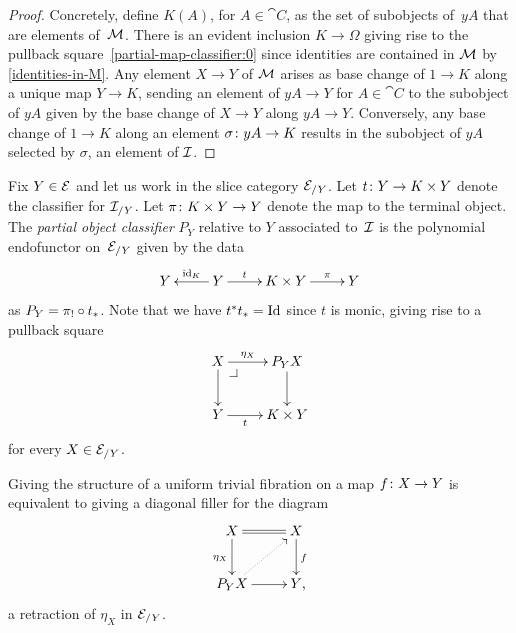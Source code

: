 \documentclass[reqno,10pt,a4paper,oneside,draft]{amsart}
\begin{document}
{{\begin{proof}
Concretely, define $K(A)$, for $A \in \cat{C}$, as the set of subobjects of~$y A$ that are elements of~$\cal{M}$.
There is an evident inclusion $K \to \Omega$ giving rise to the pullback square~\eqref{partial-map-classifier:0} since identities are contained in $\cal{M}$ by \cref{identities-in-M}.
Any element $X \to Y$ of $\cal{M}$ arises as base change of $1 \to K$ along a unique map $Y \to K$, sending an element of $y A \to Y$ for $A \in \cat{C}$ to the subobject of $y A$ given by the base change of $X \to Y$ along $y A \to Y$.
Conversely, any base change of $1 \to K$ along an element $\sigma \co y A \to K$ results in the subobject of $y A$ selected by $\sigma$, an element of $\cal{I}$.
\end{proof} 

Fix $Y \in \cal{E}$ and let us work in the slice category $\cal{E}_{/Y}$.
Let $t \co Y \to K \times Y$ denote the classifier for $\cal{I}_{/Y}$.
Let $\pi \co K \times Y \to Y$ denote the map to the terminal object.
The \emph{partial object classifier} $P_Y$ relative to $Y$ associated to~$\cal{I}$ is the polynomial endofunctor on~$\cal{E}_{/Y}$ given by the data
\[
\xymatrix{
  Y
&
  Y
  \ar[l]_-{\id_K}
  \ar[r]^-{t}
&
  K \times Y
  \ar[r]^-{\pi}
&
  Y
}
\]
as $P_Y = \pi_! \cc t_*$.
Note that we have $t^* t_* = \Id$ since $t$ is monic, giving rise to a pullback square
\begin{equation} \label{partial-map-classifier:1}
\begin{gathered}
\xymatrix{
  X
  \ar[r]^-{\eta_X}
  \ar[d]
  \pullback{dr}
&
  P_Y X
  \ar[d]
\\
  Y
  \ar[r]_-{t}
&
  K \times Y
}
\end{gathered}
\end{equation}
for every $X \in \cal{E}_{/Y}$.



\begin{theorem} \label{thm:part-map-character}
Giving the structure of a uniform trivial fibration on a map $f \co X \to Y$ is equivalent to giving a diagonal filler for the diagram
\begin{equation*}
\begin{gathered}
\xymatrix{
  X
  \ar@{=}[r]
  \ar[d]_{\eta_X}
&
  X
  \ar[d]^{f}
\\
  P_Y X
  \ar[r]
  \ar@{.>}[ur]
&
  Y
\rlap{,}}
\end{gathered}
\end{equation*}
\ie a retraction of $\eta_X$ in $\cal{E}_{/Y}$.
\end{theorem}

}}
\end{document}

